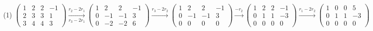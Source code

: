 \documentclass{article}
\begin{document}
\begin{itemize}
    \item[(1)] 
        $
        \begin{pmatrix}
            1 & 2 & 2 & -1 \\
            2 & 3 & 3 & 1 \\
            3 & 4 & 4 & 3
        \end{pmatrix}
        \xrightarrow[r_3 - 2r_1]{r_2 - 2r_1}
        \begin{pmatrix}
            1 & 2 & 2 & -1 \\
            0 & -1 & -1 & 3 \\
            0 & -2 & -2 & 6
        \end{pmatrix}
        \xrightarrow{r_3 - 2r_2}
        \begin{pmatrix}     
            1 & 2 & 2 & -1 \\
            0 & -1 & -1 & 3 \\
            0 & 0 & 0 & 0
        \end{pmatrix}
        \xrightarrow{-r_2}   
        \begin{pmatrix}     
            1 & 2 & 2 & -1 \\
            0 & 1 & 1 & -3 \\
            0 & 0 & 0 & 0
        \end{pmatrix}
        \xrightarrow{r_1 - 2r_2}
        \begin{pmatrix}     
            1 & 0 & 0 & 5 \\
            0 & 1 & 1 & -3 \\
            0 & 0 & 0 & 0
        \end{pmatrix}
        $


\end{itemize}
\end{document}
